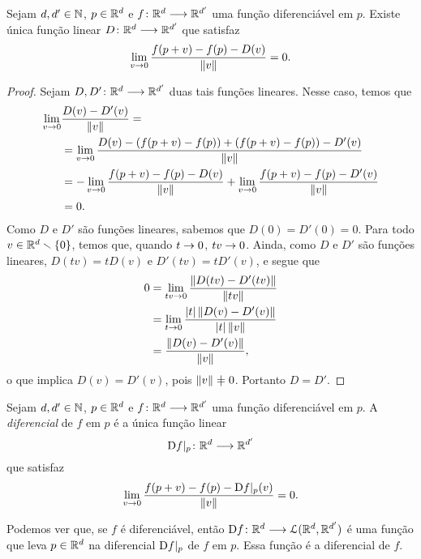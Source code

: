 \begin{proposition}
Sejam $d,d' \in \mathbb{N}$, $p \in \mathbb{R}^d$ e ${f}\colon {\mathbb{R}^d} \longrightarrow {\mathbb{R}^{d'}}$ uma função diferenciável em $p$. Existe única função linear ${D}\colon {\mathbb{R}^d} \longrightarrow {\mathbb{R}^{d'}}$ que satisfaz
	\begin{equation*}
	\lim_{v \rightarrow 0} \frac{f(p+v)-f(p)-D(v)}{\left\Vert{v}\right\Vert} = 0.
	\end{equation*}
\end{proposition}
\begin{proof}
Sejam ${D,D'}\colon {\mathbb{R}^d} \longrightarrow {\mathbb{R}^{d'}}$ duas tais funções lineares. Nesse caso, temos que
	\begin{align*}
	\lim_{v \rightarrow 0} &\frac{D(v) - D'(v)}{\left\Vert{v}\right\Vert} = \\
	&= \lim_{v \rightarrow 0} \frac{D(v) - (f(p+v)-f(p)) + (f(p+v)-f(p)) - D'(v)}{\left\Vert{v}\right\Vert} \\
	& = -\lim_{v \rightarrow 0} \frac{f(p+v)-f(p) - D(v)}{\left\Vert{v}\right\Vert} + \lim_{v \rightarrow 0} \frac{f(p+v)-f(p) - D'(v)}{\left\Vert{v}\right\Vert} \\
	&=0.
	\end{align*}
Como $D$ e $D'$ são funções lineares, sabemos que $D(0) = D'(0)=0$. Para todo $v \in \mathbb{R}^d \smallsetminus \{0\}$, temos que, quando $t \rightarrow 0$, $tv \rightarrow 0$. Ainda, como $D$ e $D'$ são funções lineares, $D(tv) = tD(v)$ e $D'(tv) = tD'(v)$, e segue que
	\begin{align*}
	0 &= \lim_{tv \rightarrow 0} \frac{\left\Vert{D(tv) - D'(tv)}\right\Vert}{\left\Vert{tv}\right\Vert} \\
		&= \lim_{t \rightarrow 0} \frac{\left\vert{t}\right\vert\left\Vert{D(v) - D'(v)}\right\Vert}{\left\vert{t}\right\vert \left\Vert{v}\right\Vert} \\
		&= \frac{\left\Vert{D(v) - D'(v)}\right\Vert}{\left\Vert{v}\right\Vert},
	\end{align*}
o que implica $D(v) = D'(v)$, pois $\nor{v} \neq 0$. Portanto $D=D'$.
\end{proof}

\begin{definition}[Diferencial]
Sejam $d,d' \in \mathbb{N}$, $p \in \mathbb{R}^d$ e ${f}\colon {\mathbb{R}^d} \longrightarrow {\mathbb{R}^{d'}}$ uma função diferenciável em $p$. A \emph{diferencial} de $f$ em $p$ é a única função linear
	\begin{equation*}
	{\mathrm{D}f|_p}\colon {\mathbb{R}^d} \longrightarrow {\mathbb{R}^{d'}}
	\end{equation*}
que satisfaz
	\begin{equation*}
	\lim_{v \rightarrow 0} \frac{f(p+v) - f(p) - \mathrm{D} f|_p(v)}{\left\Vert{v}\right\Vert} = 0.
	\end{equation*}
\end{definition}

Podemos ver que, se $f$ é diferenciável, então ${\mathrm{D} f}\colon {\mathbb{R}^d} \longrightarrow {\mathcal{L}(\mathbb{R}^d,\mathbb{R}^{d'})}$ é uma função que leva $p \in \mathbb{R}^d$ na diferencial $\mathrm{D} f|_p$ de $f$ em $p$. Essa função é a diferencial de $f$.

